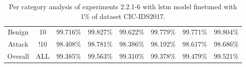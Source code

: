 \begin{table}[htb]
\begin{tabular}{@{}cccccccc@{}}
         \\
        Benign &  10 &  99.716\% &  99.827\% &  99.622\% &  99.779\% &  99.771\% &  99.804\% \\
        Attack &  !10 &  98.408\% &  98.781\% &  98.386\% &  98.192\% &  98.617\% &  98.686\% \\
        Overall &  ALL &  99.385\% &  99.563\% &  99.310\% &  99.378\% &  99.479\% &  99.521\% \\
        \bottomrule
    \end{tabular}
    \caption{Per category analysis of experiments 2.2.1-6 with \gls{lstm} model finetuned with 1\% of dataset CIC-IDS2017.}
    \label{table:results:lstm:class_flows_1}
\end{table}